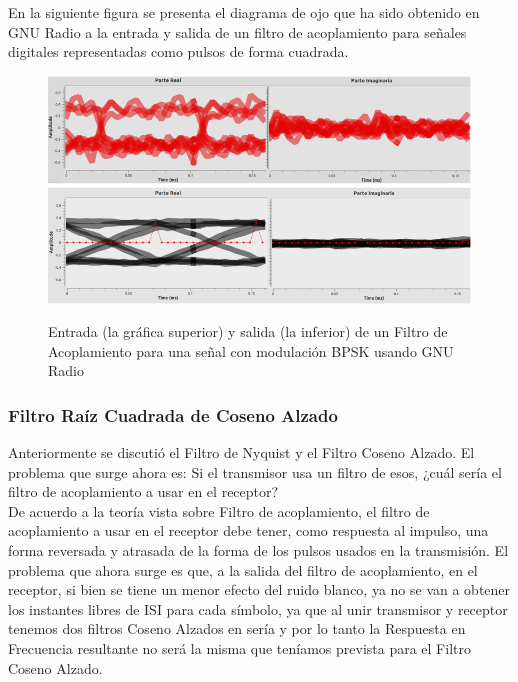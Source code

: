 En la siguiente figura se presenta el diagrama de ojo que ha sido obtenido en GNU Radio a la entrada y salida de un filtro de acoplamiento para señales digitales representadas como pulsos de forma cuadrada. \\

\vspace{200px}
\begin{figure}[h!]
	\captionsetup{justification = raggedright, singlelinecheck = false}
	\caption{Entrada (la gráfica superior) y salida (la inferior) de un Filtro de Acoplamiento para una señal con modulación BPSK usando GNU Radio } 
	\centering
	\includegraphics[scale=0.7]{Imagenes/Filtro-aco.png}
	\label{fig:Filtro-aco}
\end{figure}

\subsubsection{Filtro Raíz Cuadrada de Coseno Alzado}

Anteriormente se discutió el Filtro de Nyquist y el Filtro Coseno Alzado. El problema que surge ahora es: Si el transmisor usa un filtro de esos, ¿cuál sería el filtro de acoplamiento a usar en el receptor?\\ De acuerdo a la teoría vista sobre Filtro de acoplamiento, el filtro de acoplamiento a usar en el receptor debe tener, como respuesta al impulso, una forma reversada y atrasada de la forma de los pulsos usados en la transmisión. El problema que ahora surge es que, a la salida del filtro de acoplamiento, en el receptor, si bien se tiene un menor efecto del ruido blanco, ya no se van a obtener los instantes libres de ISI para cada símbolo, ya que al unir transmisor y receptor tenemos dos filtros Coseno Alzados en sería y por lo tanto la  Respuesta en Frecuencia resultante no será la misma que teníamos prevista para el Filtro Coseno Alzado. \\

